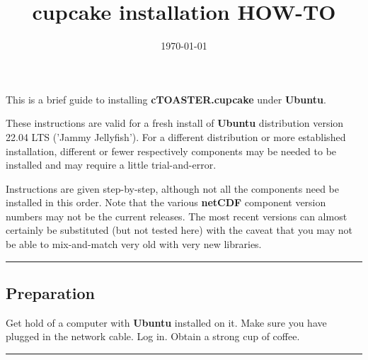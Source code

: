 \documentclass[10pt,twoside]{article}
\title{cupcake installation HOW-TO\vspace{-8mm}}
\author{}
\date{\today}
\begin{document}

\maketitle


\noindent This is a brief guide to installing \textbf{cTOASTER.cupcake} under \textbf{Ubuntu}. 

These instructions are valid for a fresh install of \textbf{Ubuntu} distribution version 22.04 LTS ('Jammy Jellyfish'). For a different distribution or more established installation, different or fewer respectively components may be needed to be installed and may require a little trial-and-error.

Instructions are given step-by-step, although not all the components need be installed in this order. Note that the various \textbf{netCDF} component version numbers may not be the current releases. The most recent versions can almost certainly be substituted (but not tested here) with the caveat that you may not be able to mix-and-match very old with very new libraries.

\vspace{1mm}
\noindent\rule{4cm}{0.1mm}

\subsection{Preparation}
\vspace{1mm}

Get hold of a computer with \textbf{Ubuntu} installed on it. Make sure you have plugged in the network cable. Log in. Obtain a strong cup of coffee.

\vspace{1mm}
\noindent\rule{4cm}{0.1mm}
\end{document}

